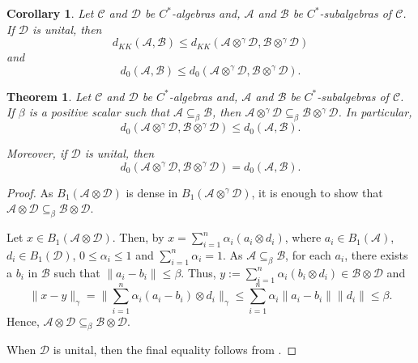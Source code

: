 \documentclass[10pt,a4paper]{amsart}
\newtheorem{cor}{Corollary}
\newtheorem{theorem}{Theorem}
\newcommand{\mA}{\mathcal{A}}
\newcommand{\mB}{\mathcal{B}}
\newcommand{\mC}{\mathcal{C}}
\newcommand{\mD}{\mathcal{D}}
\newcommand{\mcal}{\mathcal}
\begin{document}
\begin{cor}\label{D-unital}
 Let $\mC $ and $\mD $ be $C^*$-algebras and, $\mA$ and $\mB$ be
 $C^*$-subalgebras of $\mC$. If $\mD$ is unital, then
\[
d_{KK}(\mA, \mB)\leq d_{KK}(\mA \otimes^{\gamma} \mD, \mB \otimes^{\gamma} \mD)
\]
 and \[
d_{0}(\mA, \mB)\leq d_{0}(\mA \otimes^{\gamma} \mD, \mB \otimes^{\gamma} \mD).
\]
\end{cor}

\begin{theorem}\label{Projective-Ch}
Let $\mC$ and $\mD$ be $C^*$-algebras and, $\mA$ and $\mB$ be
$C^*$-subalgebras of $\mC$. If $\beta$ is a positive scalar such that
$\mA \subseteq_{\beta}\mB$, then $\mA \otimes^{\gamma} \mD
\subseteq_{\beta}\mB \otimes^{\gamma} \mD$.  In particular,
$$d_0(\mA \otimes^{\gamma} \mD, \mB \otimes^{\gamma} \mD) \leq
d_0(\mA, \mB).$$

Moreover, if $\mD$ is unital, then
$$d_{0}(\mA \otimes^{\gamma} \mD, \mB \otimes^{\gamma} \mD) = d_{0}(\mA, \mB).$$ 
\end{theorem}

\begin{proof}
As $B_{1}(\mA \otimes \mD)$ is dense in $B_{1}(\mA \otimes^{\gamma}
\mD)$, it is enough to show that $\mA \otimes \mD \subseteq_{\beta}\mB
\otimes \mD$.

Let $x\in B_{1}(\mA \otimes \mD)$. Then, by  $x=
\sum_{i=1}^{n}\alpha_{i} (a_{i}\otimes d_{i})$, where $a_{i}\in
B_{1}(\mA)$, $d_{i}\in B_{1}(\mD)$, $0\leq \alpha_{i}\leq 1$ and
$\sum_{i=1}^{n}\alpha_{i}= 1$. As $\mA \subseteq_{\beta} \mB$, for
each $a_{i}$, there exists a $b_{i}$ in $\mB$ such that
\(
\|a_{i}-b_{i}\| \leq  \beta.
\) 
Thus, $y := \sum_{i=1}^{n}\alpha_{i} (b_{i}\otimes d_{i})\in \mB\otimes \mD$ and 
\[
\|x-y\|_{\gamma} = 
\|\sum_{i=1}^{n}\alpha_{i} (a_{i}-b_{i})\otimes d_{i}\|_{\gamma} \leq  \sum_{i=1}^{n}\alpha_{i} \|a_{i}-b_{i}\|\|d_{i}\|  \leq
  \beta.
\]
Hence, $\mA \otimes \mD \subseteq_{\beta}\mB
\otimes \mD$.

When $\mcal{D}$ is unital, then the final equality follows from
.
\end{proof}
\end{document}
